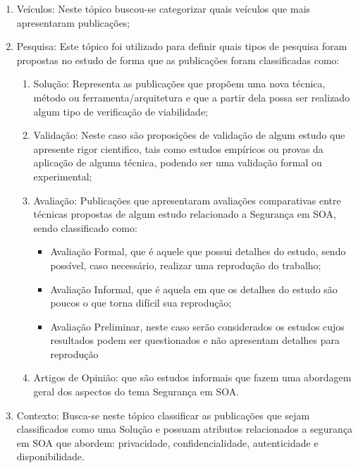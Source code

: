 \begin{enumerate}
            \item Veículos: Neste tópico buscou-se categorizar quais veículos que mais apresentaram publicações;
            \item Pesquisa: Este tópico foi utilizado para definir quais tipos de pesquisa foram propostas no estudo de forma que as publicações foram classificadas como:
                \begin{enumerate}[ a )]
                 \item Solução: Representa as publicações que propõem uma nova técnica, método ou ferramenta/arquitetura e que a partir dela possa ser realizado algum tipo de verificação de viabilidade;

                 \item Validação: Neste caso são proposições de validação de algum estudo que apresente rigor cientifico, tais como estudos empíricos ou provas da aplicação de alguma técnica, podendo ser uma validação formal ou experimental;

                 \item Avaliação: Publicações que apresentaram avaliações comparativas entre técnicas propostas de algum estudo relacionado a Segurança em SOA, sendo  classificado como:

                    \begin{itemize}
                         \item Avaliação Formal, que é aquele que possui detalhes do estudo, sendo possível, caso necessário, realizar uma reprodução do trabalho;

                        \item Avaliação Informal, que é  aquela em que os detalhes do estudo são poucos o que torna difícil sua reprodução;

                        \item Avaliação Preliminar, neste caso serão considerados os estudos cujos resultados podem ser questionados e não apresentam detalhes para reprodução
                    \end{itemize}


                 \item Artigos de Opinião: que são estudos informais que fazem uma abordagem geral dos aspectos do tema Segurança em SOA.

            \end{enumerate}

            \item Contexto: Busca-se neste tópico classificar as publicações que sejam classificados como uma Solução e possuam atributos  relacionados a segurança em SOA que abordem: privacidade, confidencialidade, autenticidade e disponibilidade.

\end{enumerate}

